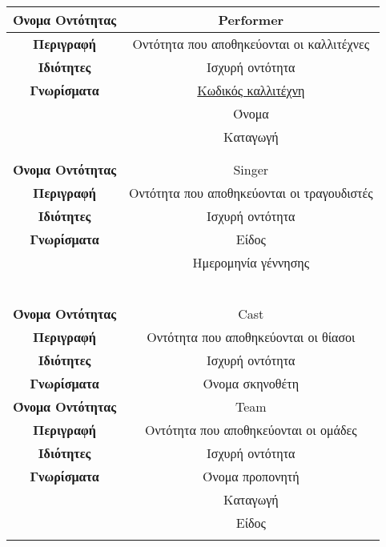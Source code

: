 \begin{center}
\begin{tabular}[]{|c | c | } 
\hline
\textbf{Όνομα Οντότητας}   &  Performer \\ \hline 
\textbf{Περιγραφή}         &  Οντότητα που αποθηκεύονται οι καλλιτέχνες \\ \hline 
\textbf{Ιδιότητες}         &  Ισχυρή οντότητα    \\    \hline           
\textbf{Γνωρίσματα}        &  \underline{Κωδικός καλλιτέχνη}\\
                           &  Όνομα  \\
           ~               &  Καταγωγή \\
\\ \hline 
\\ \hline
\textbf{Όνομα Οντότητας}   &  Singer \\ \hline 
\textbf{Περιγραφή}         &  Οντότητα που αποθηκεύονται οι τραγουδιστές\\ \hline 
\textbf{Ιδιότητες}         &  Ισχυρή οντότητα    \\    \hline           
\textbf{Γνωρίσματα}        &  Είδος \\
                           &  Ημερομηνία γέννησης \\
            ~        
\\ \hline 
\\ \hline
\textbf{Όνομα Οντότητας}   &  Cast \\ \hline 
\textbf{Περιγραφή}         &  Οντότητα που αποθηκεύονται οι θίασοι \\ \hline 
\textbf{Ιδιότητες}         &  Ισχυρή οντότητα    \\    \hline           
\textbf{Γνωρίσματα}        &  Όνομα σκηνοθέτη \\
\hline 
\hline
\textbf{Όνομα Οντότητας}   &  Team \\ \hline 
\textbf{Περιγραφή}         &  Οντότητα που αποθηκεύονται οι ομάδες \\ \hline 
\textbf{Ιδιότητες}         &  Ισχυρή οντότητα    \\    \hline           
\textbf{Γνωρίσματα}        &  Όνομα προπονητή \\
           ~               &  Καταγωγή \\
            ~              &  Είδος \\
\\ \hline 


\end{tabular}
\end{center}
